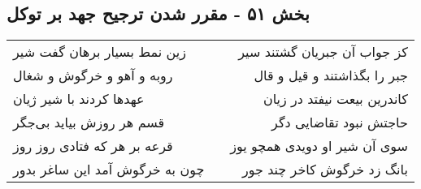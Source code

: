 \begin{center}
\section*{بخش ۵۱ - مقرر شدن ترجیح جهد بر توکل}
\label{sec:sh051}
\begin{longtable}{l p{0.5cm} r}
زین نمط بسیار برهان گفت شیر
&&
کز جواب آن جبریان گشتند سیر
\\
روبه و آهو و خرگوش و شغال
&&
جبر را بگذاشتند و قیل و قال
\\
عهدها کردند با شیر ژیان
&&
کاندرین بیعت نیفتد در زیان
\\
قسم هر روزش بیاید بی‌جگر
&&
حاجتش نبود تقاضایی دگر
\\
قرعه بر هر که فتادی روز روز
&&
سوی آن شیر او دویدی همچو یوز
\\
چون به خرگوش آمد این ساغر بدور
&&
بانگ زد خرگوش کاخر چند جور
\\
\end{longtable}
\end{center}
